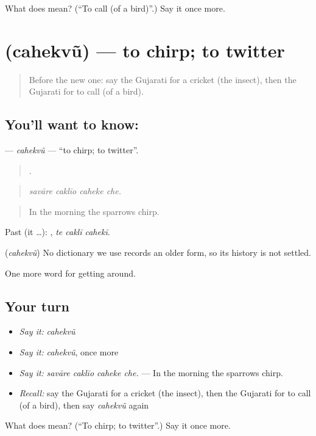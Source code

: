 \begin{tcolorbox}[breakable,colback=teal!4,colframe=teal!35!black,title={Before you move on}]
What does  mean? (\textquotedblleft{}To call (of a bird)\textquotedblright{}.) Say it once more.
\end{tcolorbox}
\section[\texorpdfstring{\gu{ચહેકવું} (cahekvũ)}{ચહેકવું (cahekvũ)}]{ (cahekvũ) — to chirp; to twitter}

\label{lesson:GU-C445-cahekvu}



\begin{quote}
Before the new one: say the Gujarati for a cricket (the insect), then the Gujarati for to call (of a bird).
\end{quote}

\subsection*{You'll want to know: }
\textbf{} — \emph{cahekvũ} — \textquotedblleft{}to chirp; to twitter\textquotedblright{}.

\begin{quote}
   .
\end{quote}

\begin{quote}
\emph{savāre caklīo caheke che.}
\end{quote}

\begin{quote}
In the morning the sparrows chirp.
\end{quote}

Past (it …):   , \emph{te caklī cahekī}.

\begin{cousinweb}
\textbf{} (\emph{cahekvũ}) No dictionary we use records an older form, so its history is not settled.
\end{cousinweb}

\begin{grammarlens}[title={What you've built}]
One more word for getting around.
\end{grammarlens}

\subsection*{Your turn}
\begin{itemize}
\raggedright
  \item \emph{Say it:} \emph{cahekvũ}
  \item \emph{Say it:} \emph{cahekvũ}, once more
  \item \emph{Say it:} \emph{savāre caklīo caheke che.} — In the morning the sparrows chirp.
  \item \emph{Recall:} say the Gujarati for a cricket (the insect), then the Gujarati for to call (of a bird), then say \emph{cahekvũ} again
\end{itemize}

\begin{tcolorbox}[breakable,colback=teal!4,colframe=teal!35!black,title={Before you move on}]
What does  mean? (\textquotedblleft{}To chirp; to twitter\textquotedblright{}.) Say it once more.
\end{tcolorbox}
